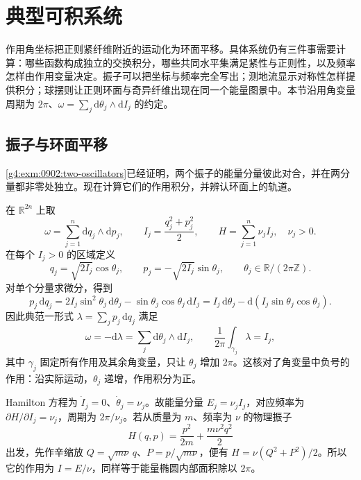 
% 
% 
% 

\section{典型可积系统}
\label{g4:sec:1104}

作用角坐标把正则紧纤维附近的运动化为环面平移。具体系统仍有三件事需要计算：哪些函数构成独立的交换积分，哪些共同水平集满足紧性与正则性，以及频率怎样由作用变量决定。振子可以把坐标与频率完全写出；测地流显示对称性怎样提供积分；球摆则让正则环面与奇异纤维出现在同一个能量图景中。本节沿用角变量周期为 \(2\pi\)、\(\omega=\sum_j\mathrm{d}\theta_j\wedge\mathrm{d}I_j\) 的约定。

\subsection{振子与环面平移}
\label{g4:subsec:1104:01}
\cref{g4:exm:0902:two-oscillators}已经证明，两个振子的能量分量彼此对合，并在两分量都非零处独立。现在计算它们的作用积分，并辨认环面上的轨道。

\begin{example}\label{g4:exm:1104:oscillator-actions}
	在 \(\mathbb R^{2n}\) 上取
	\[
		\omega=\sum_{j=1}^n\mathrm{d}q_j\wedge\mathrm{d}p_j,
		\qquad I_j=\frac{q_j^2+p_j^2}{2},
		\qquad H=\sum_{j=1}^n\nu_jI_j,
		\quad \nu_j>0.
	\]
	在每个 \(I_j>0\) 的区域定义
	\begin{equation}\label{g4:eq:1104:oscillator-angles}
		q_j=\sqrt{2I_j}\cos\theta_j,
		\qquad p_j=-\sqrt{2I_j}\sin\theta_j,
		\qquad \theta_j\in\mathbb R/(2\pi\mathbb Z).
	\end{equation}
	对单个分量求微分，得到
	\[
		p_j\,\mathrm{d}q_j
		=2I_j\sin^2\theta_j\,\mathrm{d}\theta_j
		-\sin\theta_j\cos\theta_j\,\mathrm{d}I_j
		=I_j\,\mathrm{d}\theta_j
		-\mathrm{d}(I_j\sin\theta_j\cos\theta_j).
	\]
	因此典范一形式 \(\lambda=\sum_jp_j\,\mathrm{d}q_j\) 满足
	\begin{equation}\label{g4:eq:1104:oscillator-action-integral}
		\omega=-\mathrm{d}\lambda
		=\sum_j\mathrm{d}\theta_j\wedge\mathrm{d}I_j,
		\qquad
		\frac1{2\pi}\int_{\gamma_j}\lambda=I_j,
	\end{equation}
	其中 \(\gamma_j\) 固定所有作用及其余角变量，只让 \(\theta_j\) 增加 \(2\pi\)。这核对了角变量中负号的作用：沿实际运动，\(\theta_j\) 递增，作用积分为正。

	Hamilton 方程为 \(\dot I_j=0\)、\(\dot\theta_j=\nu_j\)。故能量分量 \(E_j=\nu_jI_j\)，对应频率为 \(\partial H/\partial I_j=\nu_j\)，周期为 \(2\pi/\nu_j\)。若从质量为 \(m\)、频率为 \(\nu\) 的物理振子
	\[
		H(q,p)=\frac{p^2}{2m}+\frac{m\nu^2q^2}{2}
	\]
	出发，先作辛缩放 \(Q=\sqrt{m\nu}\,q\)、\(P=p/\sqrt{m\nu}\)，便有 \(H=\nu(Q^2+P^2)/2\)。所以它的作用为 \(I=E/\nu\)，同样等于能量椭圆内部面积除以 \(2\pi\)。
\end{example}


